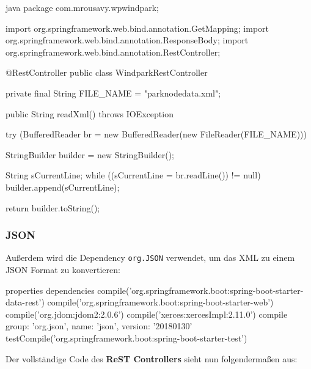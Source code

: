 \begin{code}{java}
    package com.mrousavy.wpwindpark;

    import org.springframework.web.bind.annotation.GetMapping;
    import org.springframework.web.bind.annotation.ResponseBody;
    import org.springframework.web.bind.annotation.RestController;

    @RestController
    public class WindparkRestController {

        private final String FILE_NAME = "parknodedata.xml";

        public String readXml() throws IOException {
            try (BufferedReader br = new BufferedReader(new FileReader(FILE_NAME))) {
                StringBuilder builder = new StringBuilder();

                String sCurrentLine;
                while ((sCurrentLine = br.readLine()) != null) {
                    builder.append(sCurrentLine);
                }

                return builder.toString();
            }
        }
    }
\end{code}

\subsubsection{JSON}

Außerdem wird die Dependency \texttt{org.JSON} verwendet, um das XML zu einem JSON Format zu konvertieren:

\begin{code}{properties}
    dependencies {
        compile('org.springframework.boot:spring-boot-starter-data-rest')
        compile('org.springframework.boot:spring-boot-starter-web')
        compile('org.jdom:jdom2:2.0.6')
        compile('xerces:xercesImpl:2.11.0')
        compile group: 'org.json', name: 'json', version: '20180130'
        testCompile('org.springframework.boot:spring-boot-starter-test')
    }
\end{code}

Der vollständige Code des \textbf{ReST Controllers} sieht nun folgendermaßen aus:

